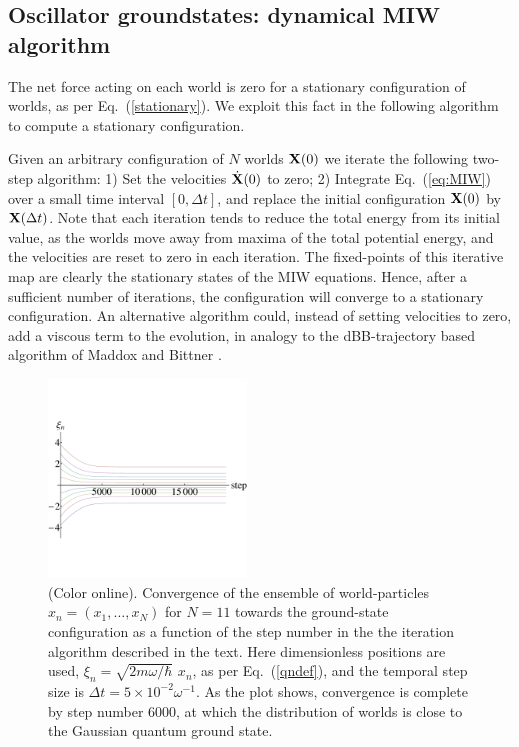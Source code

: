 \documentclass[twocolumn,aps,pra,amsmath,amssymb,superscriptaddress]{revtex4}
\renewcommand{\(}{\left(}
\renewcommand{\)}{\right)}
\newcommand{\blk}{\color{black}}
\begin{document}
\subsection{Oscillator groundstates: dynamical MIW algorithm}

The net force acting on each world is zero for a stationary configuration of
worlds, as per Eq.~(\ref{stationary}). We exploit this fact in the following
algorithm to compute a stationary configuration. \blk

Given an arbitrary configuration of $N$ worlds ${\bf X}(0)$ we iterate the
following two-step algorithm: \blk 1) Set the velocities $\dot{\bf X}(0)$ to zero; 2) 
Integrate Eq.~(\ref{eq:MIW}) over a small time interval $[0,\Delta t]$, and replace the
initial
configuration ${\bf X}(0)$ by
${\bf X}( \Delta t)$. 
Note that each iteration tends to reduce the
total energy from its initial value, as the worlds move away from maxima of the
total potential energy, and the velocities are reset to zero in each
iteration.  The fixed-points of this iterative map are clearly the stationary
states of the MIW equations.   Hence, after a sufficient number of iterations,
the configuration will converge to a stationary configuration.  An alternative algorithm could, instead of setting velocities to zero, add a viscous term to the evolution, in analogy to the dBB-trajectory based algorithm of Maddox and Bittner \cite{mad}.

\begin{figure}[!t]
	\centering
    \includegraphics[width=0.47\textwidth]{groundstate-trajectories.pdf}
    \caption{\label{trajectories} (Color online).
  Convergence of the ensemble of 
 world-particles $x_n =(x_1,\ldots,x_N)$ for $N=11$ towards the ground-state configuration
 as a function of the step number in the the iteration algorithm described in the text. 
  Here dimensionless positions are used, $\xi_n = \sqrt{2m\omega/\hbar} \,\,x_n$, as per Eq.~(\ref{qndef}),
  and the temporal step size is 
 $\Delta t = 5\times 10^{-2} \omega^{-1}$.  As the plot shows, convergence is complete by step number 6000, 
  at which the 
        distribution of worlds is close to the Gaussian quantum ground state. }
  \end{figure}
  
\end{document}
